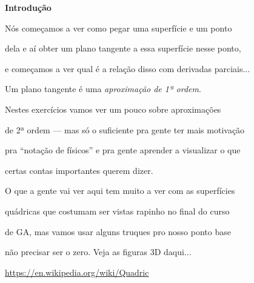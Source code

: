 \documentclass[oneside,12pt]{article}
\begin{document}
\newpage

{\bf Introdução}

Nós começamos a ver como pegar uma superfície e um ponto

dela e aí obter um plano tangente a essa superfície nesse ponto,

e começamos a ver qual é a relação disso com derivadas parciais...

\msk

Um plano tangente é uma {\sl aproximação de 1ª ordem}.

Nestes exercícios vamos ver um pouco sobre aproximações

de 2ª ordem --- mas só o suficiente pra gente ter mais motivação

pra ``notação de físicos'' e pra gente aprender a visualizar o que

certas contas importantes querem dizer.


\msk

O que a gente vai ver aqui tem muito a ver com as superfícies

quádricas que costumam ser vistas rapinho no final do curso

de GA, mas vamos usar alguns truques pro nosso ponto base

não precisar ser o zero. Veja as figuras 3D daqui...

\msk

{\scriptsize

\url{https://en.wikipedia.org/wiki/Quadric}

}


\newpage

% 
% 
% 
% 
% 
% 
% 
\end{document}
